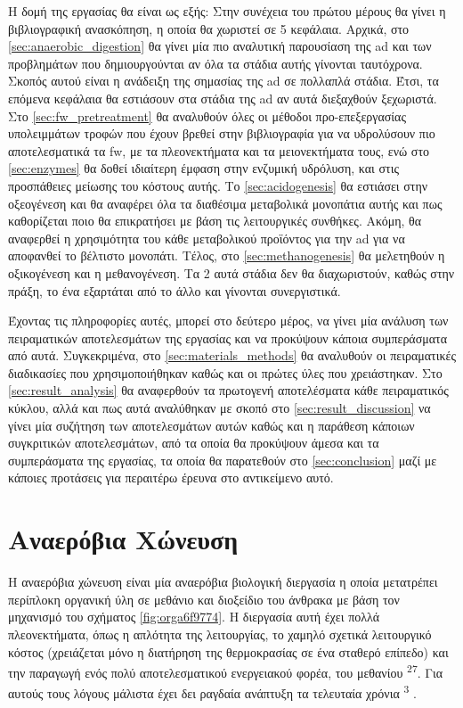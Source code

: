 \documentclass[11pt]{report}
\makeatletter
\newcommand{\citeprocitem}[2]{\hyper@linkstart{cite}{citeproc_bib_item_#1}#2\hyper@linkend}
\makeatother
\begin{document}
Η δομή της εργασίας θα είναι ως εξής: Στην συνέχεια του πρώτου μέρους θα γίνει η βιβλιογραφική ανασκόπηση, η οποία θα χωριστεί σε 5 κεφάλαια. Αρχικά, στο \autoref{sec:anaerobic_digestion} θα γίνει μία πιο αναλυτική παρουσίαση της \acrshort{ad} και των προβλημάτων που δημιουργούνται αν όλα τα στάδια αυτής γίνονται ταυτόχρονα. Σκοπός αυτού είναι η ανάδειξη της σημασίας της \acrshort{ad} σε πολλαπλά στάδια. Έτσι, τα επόμενα κεφάλαια θα εστιάσουν στα στάδια της \acrshort{ad} αν αυτά διεξαχθούν ξεχωριστά. Στο \autoref{sec:fw_pretreatment} θα αναλυθούν όλες οι μέθοδοι προ-επεξεργασίας υπολειμμάτων τροφών που έχουν βρεθεί στην βιβλιογραφία για να υδρολύσουν πιο αποτελεσματικά τα \acrshort{fw}, με τα πλεονεκτήματα και τα μειονεκτήματα τους, ενώ στο \autoref{sec:enzymes} θα δοθεί ιδιαίτερη έμφαση στην ενζυμική υδρόλυση, και στις προσπάθειες μείωσης του κόστους αυτής. Το \autoref{sec:acidogenesis} θα εστιάσει στην οξεογένεση και θα αναφέρει όλα τα διαθέσιμα μεταβολικά μονοπάτια αυτής και πως καθορίζεται ποιο θα επικρατήσει με βάση τις λειτουργικές συνθήκες. Ακόμη, θα αναφερθεί η χρησιμότητα του κάθε μεταβολικού προϊόντος για την \acrshort{ad} για να αποφανθεί το βέλτιστο μονοπάτι. Τέλος, στο \autoref{sec:methanogenesis} θα μελετηθούν η οξικογένεση και η μεθανογένεση. Τα 2 αυτά στάδια δεν θα διαχωριστούν, καθώς στην πράξη, το ένα εξαρτάται από το άλλο και γίνονται συνεργιστικά.

Έχοντας τις πληροφορίες αυτές, μπορεί στο δεύτερο μέρος, να γίνει μία ανάλυση των πειραματικών αποτελεσμάτων της εργασίας και να προκύψουν κάποια συμπεράσματα από αυτά. Συγκεκριμένα, στο \autoref{sec:materials_methods} θα αναλυθούν οι πειραματικές διαδικασίες που χρησιμοποιήθηκαν καθώς και οι πρώτες ύλες που χρειάστηκαν. Στο \autoref{sec:result_analysis} θα αναφερθούν τα πρωτογενή αποτελέσματα κάθε πειραματικός κύκλου, αλλά και πως αυτά αναλύθηκαν με σκοπό στο \autoref{sec:result_discussion} να γίνει μία συζήτηση των αποτελεσμάτων αυτών καθώς και η παράθεση κάποιων συγκριτικών αποτελεσμάτων, από τα οποία θα προκύψουν άμεσα και τα συμπεράσματα της εργασίας, τα οποία θα παρατεθούν στο \autoref{sec:conclusion} μαζί με κάποιες προτάσεις για περαιτέρω έρευνα στο αντικείμενο αυτό.

\chapter{Αναερόβια Χώνευση}
\label{sec:org610ddae}
\label{sec:anaerobic_digestion}

Η αναερόβια χώνευση είναι μία αναερόβια βιολογική διεργασία η οποία μετατρέπει περίπλοκη οργανική ύλη σε μεθάνιο και διοξείδιο του άνθρακα με βάση τον μηχανισμό του σχήματος \ref{fig:orga6f9774}. Η διεργασία αυτή έχει πολλά πλεονεκτήματα, όπως η απλότητα της λειτουργίας, το χαμηλό σχετικά λειτουργικό κόστος (χρειάζεται μόνο η διατήρηση της θερμοκρασίας σε ένα σταθερό επίπεδο) και την παραγωγή ενός πολύ αποτελεσματικού ενεργειακού φορέα, του μεθανίου \textsuperscript{\citeprocitem{27}{27}}. Για αυτούς τους λόγους μάλιστα έχει δει ραγδαία ανάπτυξη τα τελευταία χρόνια \textsuperscript{\citeprocitem{3}{3}} .
\end{document}

